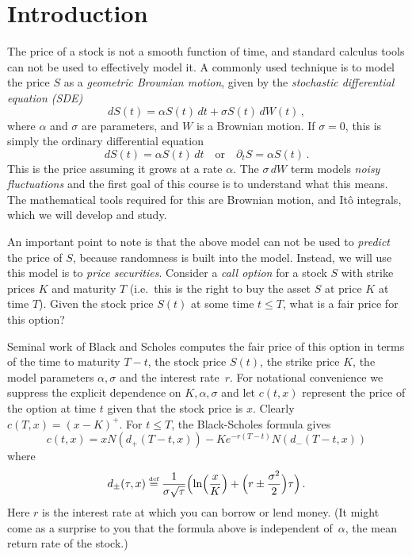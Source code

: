 
\chapter{Introduction}

The price of a stock is not a smooth function of time, and standard calculus tools can not be used to effectively model it.
A commonly used technique is to model the price $S$ as a \emph{geometric Brownian motion}, given by the \emph{stochastic differential equation (SDE)}
\begin{equation*}
  dS(t) = \alpha S(t) \, dt + \sigma S(t) \, dW(t)\,,
\end{equation*}
where $\alpha$ and $\sigma$ are parameters, and $W$ is a Brownian motion.
If $\sigma = 0$, this is simply the ordinary differential equation
\begin{equation*}
  dS(t) = \alpha S(t) \, dt
  \quad\text{or}\quad
  \partial_t S = \alpha S(t)\,.
\end{equation*}
This is the price assuming it grows at a rate $\alpha$.
The $\sigma \, dW$ term models \emph{noisy fluctuations} and the first goal of this course is to understand what this means.
The mathematical tools required for this are Brownian motion, and It\^o integrals, which we will develop and study.

An important point to note is that the above model can not be used to \emph{predict} the price of $S$, because randomness is built into the model.
Instead, we will use this model is to \emph{price securities}.
Consider a \emph{call option} for a stock $S$ with strike prices $K$ and maturity $T$ (i.e.\ this is the right to buy the asset $S$ at price $K$ at time $T$).
Given the stock price $S(t)$ at some time $t \leq T$, what is a fair price for this option?

Seminal work of Black and Scholes computes the fair price of this option in terms of the time to maturity $T - t$, the stock price $S(t)$, the strike price $K$, the model parameters $\alpha, \sigma$ and the interest rate~$r$.
For notational convenience we suppress the explicit dependence on $K, \alpha, \sigma$ and let $c(t, x)$ represent the price of the option at time $t$ given that the stock price is $x$.
Clearly $c(T, x) = (x - K)^+$.
For $t \leq T$, the Black-Scholes formula gives
\begin{equation*}
  c(t, x) = x N( d_+(T - t, x) ) - Ke^{-r (T-t)} N( d_-(T-t, x) )
\end{equation*}
where
\begin{equation*}
  d_\pm( \tau, x ) \defeq
    \frac{1}{\sigma \sqrt{\tau}}\paren[\Big]{
	\ln\paren[\Big]{\frac{x}{K}}
	+ \paren[\Big]{ r \pm \frac{\sigma^2}{2} } \tau
      }\,.
\end{equation*}
Here $r$ is the interest rate at which you can borrow or lend money.
(It might come as a surprise to you that the formula above is independent of~$\alpha$, the mean return rate of the stock.)

